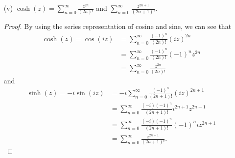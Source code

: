 \documentclass[a4paper]{article}
\begin{document}
\begin{enumerate}
\begin{proof}
        \end{proof}
    \item[(v)] \( \cosh(z) = \sum_{ n=0 }^{ \infty  } \frac{ z^{2n} }{ (2n)! }   \) and \( \sum_{ n=0 }^{ \infty  } \frac{ z^{2n+1} }{ (2n+1)! }  \).
        \begin{proof}
        By using the series representation of cosine and sine, we can see that  
        \begin{align*}
            \cosh(z) = \cos(iz) &= \sum_{ n=0 }^{ \infty  } \frac{ (-1)^{n} }{ (2n)! } (iz)^{2n} \\
                                &= \sum_{ n=0  }^{ \infty  } \frac{ (-1)^{n} }{ (2n)! } (-1)^{n} z^{2n} \\
                                &= \sum_{ n=0 }^{ \infty  } \frac{ z^{2n} }{ (2n)! } 
        \end{align*}
        and 
        \begin{align*}
            \sinh(z) = -i \sin(iz) &= -i \sum_{ n=0 }^{ \infty  } \frac{ (-1)^{n} }{ (2n+1)! } (iz)^{2n+1} \\
                                   &=  \sum_{ n=0  }^{ \infty  } \frac{ (-i) (-1)^{n}  }{  (2n+1)! } i^{2n+1} z^{2n+1} \\ 
                                   &= \sum_{ n=0 }^{ \infty  } \frac{ (-i) (-1)^{n} }{ (2n+1)! } (-1)^{n} i z^{2n+1} \\
                                   &= \sum_{ n=0 }^{ \infty  } \frac{ z^{2n+1} }{ (2n+1)! }.
        \end{align*}
        \end{proof}
\end{enumerate}
\end{document}
